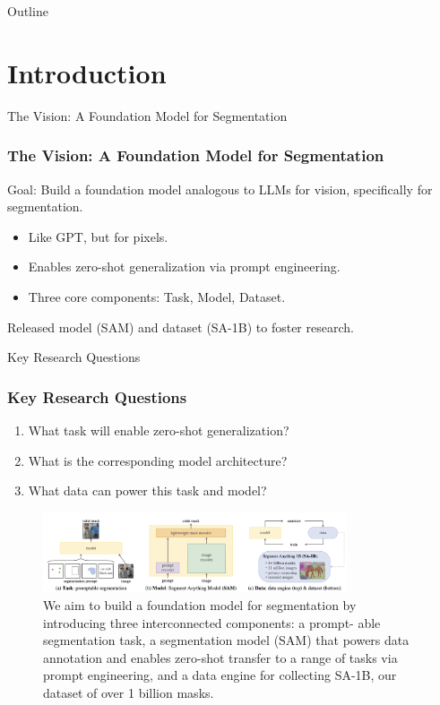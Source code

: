 \documentclass{beamer}
\begin{document}
\begin{frame}{Outline}
    \tableofcontents
\end{frame}

\section{Introduction}

\begin{frame}{The Vision: A Foundation Model for Segmentation}
    \frametitle{The Vision: A Foundation Model for Segmentation}
    Goal: Build a foundation model analogous to LLMs for vision, specifically for segmentation.
    \begin{itemize}
        \item Like GPT, but for pixels.
        \item Enables zero-shot generalization via prompt engineering.
        \item Three core components: Task, Model, Dataset.
    \end{itemize}
    Released model (SAM) and dataset (SA-1B) to foster research.
\end{frame}

\begin{frame}{Key Research Questions}
    \frametitle{Key Research Questions}
    \begin{enumerate}
        \item What task will enable zero-shot generalization?
        \item What is the corresponding model architecture?
        \item What data can power this task and model?
    \end{enumerate}
    \begin{figure}
        \centering
        \includegraphics[width=0.8\textwidth]{figures/SA_overview.png}
        \caption{We aim to build a foundation model for segmentation by introducing three interconnected components: a prompt-
        able segmentation task, a segmentation model (SAM) that powers data annotation and enables zero-shot transfer to a range
        of tasks via prompt engineering, and a data engine for collecting SA-1B, our dataset of over 1 billion masks.}
    \end{figure}
\end{frame}
\end{document}
